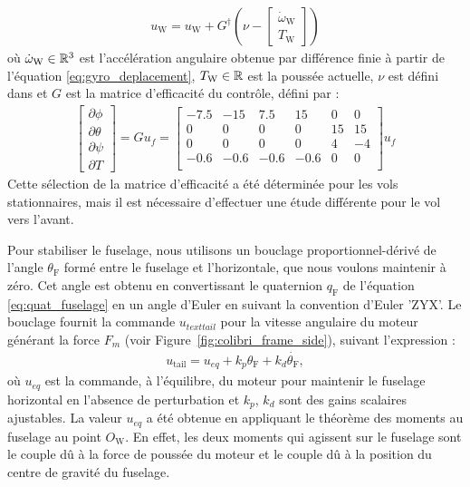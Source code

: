 \begin{align}
    u_{\text{W}} = u_{\text{W}} + G^{\dag} (\nu - \begin{bmatrix}
    \dot{\omega}_{\text{W}} \\
    T_{\text{W}}
    \end{bmatrix})
\end{align}
où  $ \dot{\omega}_{\text{W}} \in {\mathbb R}^{3}$ est l'accélération angulaire obtenue par différence finie à partir de l'équation \eqref{eq:gyro_deplacement},  $T_{\text{W}} \in {\mathbb R}$ est la poussée actuelle, $\nu$ est défini dans \cite[équation (4)]{smeurINDITail} et $G$ est la matrice d'efficacité du contrôle, défini par :
\begin{align*}
    \begin{bmatrix}
    \partial \phi \\
    \partial \theta \\
    \partial \psi \\
    \partial T
    \end{bmatrix}\! =\! G u_{f} \!=\!
    \begin{bmatrix}
    -7.5 & -15 & 7.5 & 15 & 0 & 0\\
    0 & 0 & 0 & 0 & 15 & 15 \\
    0 & 0 & 0 & 0 & 4 & -4 \\
    -0.6 & -0.6 & -0.6 & -0.6 & 0 & 0\\
    \end{bmatrix}
    u_{f}
\end{align*}
Cette sélection de la matrice d'efficacité a été déterminée pour les vols stationnaires, mais il est nécessaire d'effectuer une étude différente pour le vol vers l'avant.

Pour stabiliser le fuselage, nous utilisons un bouclage proportionnel-dérivé de l'angle $\theta_{\text{F}}$ formé entre le fuselage et l'horizontale, que nous voulons maintenir à zéro. Cet angle est obtenu en convertissant le quaternion $q_{\text{F}}$ de l'équation \eqref{eq:quat_fuselage} en un angle d'Euler en suivant la convention d'Euler 'ZYX'. Le bouclage fournit la commande $u_{text{tail}}$ pour la vitesse angulaire du moteur générant la force $F_{m}$ (voir Figure~\ref{fig:colibri_frame_side}), suivant l'expression :
\begin{align*}
    u_{\text{tail}} = u_{eq} + k_{p} \theta_{\text{F}} + k_{d} \dot{\theta_{\text{F}}},
\end{align*}
où $u_{eq}$ est la commande, à l'équilibre, du moteur pour maintenir le fuselage horizontal en l'absence de perturbation et $k_{p}$, $k_{d}$ sont des gains scalaires ajustables. La valeur $u_{eq}$ a été obtenue en appliquant le théorème des moments au fuselage au point $O_{\text{W}}$. En effet, les deux moments qui agissent sur le fuselage sont le couple dû à la force de poussée du moteur et le couple dû à la position du centre de gravité du fuselage.

